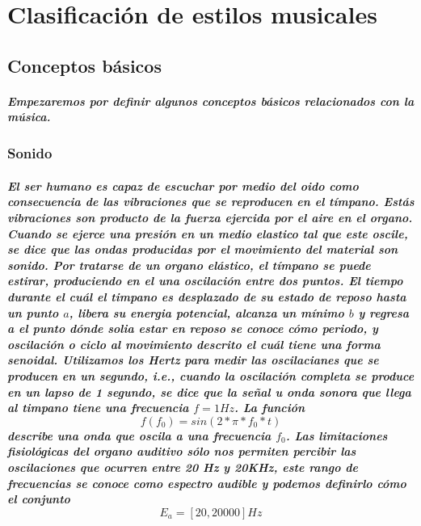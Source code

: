 \chapter{Clasificación de estilos musicales}

\section{Conceptos básicos}
\paragraph{Empezaremos por definir algunos conceptos básicos relacionados con la música.}


\subsection{Sonido}
    \paragraph{El ser humano es capaz de escuchar por medio del oido como consecuencia de las vibraciones que se reproducen en el tímpano. Estás vibraciones son producto de la fuerza ejercida por el aire en el organo. Cuando se ejerce una presión en un medio elastico tal que este oscile, se dice que las ondas producidas por el movimiento del material son sonido. Por tratarse de un organo elástico, el tímpano se puede estirar, produciendo en el una oscilación entre dos puntos. El tiempo durante el cuál el timpano es desplazado de su estado de reposo hasta un punto $a$, libera su energia potencial, alcanza un mínimo $b$ y regresa a el punto dónde solia estar en reposo se conoce cómo periodo, y oscilación o ciclo al movimiento descrito el cuál tiene una forma senoidal. Utilizamos los Hertz para medir las oscilacianes que se producen en un segundo, i.e., cuando la oscilación completa se produce en un lapso de 1 segundo, se dice que la señal u onda sonora que llega al timpano tiene una frecuencia $f = 1 Hz$. La función $$f(f_0) = sin(2*\pi*f_0*t)$$ describe una onda que oscila a una frecuencia $f_0$. Las limitaciones fisiológicas del organo auditivo sólo nos permiten percibir las oscilaciones que ocurren entre 20 Hz y 20KHz, este rango de frecuencias se conoce como espectro audible y podemos definirlo cómo el conjunto $$ E_a = [20, 20000] Hz$$}
    
